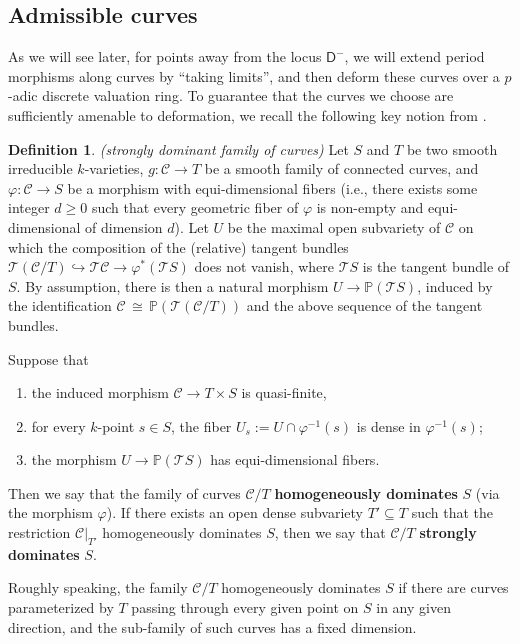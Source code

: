 \documentclass[11pt, letterpaper]{amsart}
\theoremstyle{plain}
\theoremstyle{definition}
\newtheorem{definition}[theorem]{Definition}
\newcommand{\IP}{\mathbb{P}}
\newcommand\iso{\,{\cong}\,}
\newcommand{\<}{\langle}
\renewcommand{\>}{\rangle}
\newcommand{\into}{\hookrightarrow}
\newcommand{\sfD}{\mathsf{D}}
\newcommand{\sT}{\mathcal{T}}
\newcommand{\shC}{\mathscr{C}}
\begin{document}
\subsection{Admissible curves}
\label{sub:adm_cur}
As we will see later, for points away from the locus $\sfD^-$, we will extend period morphisms along curves by ``taking limits'', and then deform these curves over a $p$-adic discrete valuation ring. To guarantee that the curves we choose are sufficiently amenable to deformation, we recall the following key notion from \cite[Def.~6.1.1]{HYZ}.

\begin{definition}
    \label{def: strongly dominant}
    \emph{(strongly dominant family of curves)}
    Let $S$ and $T$ be two smooth irreducible $k$-varieties, $g \colon \shC \to T$ be a smooth family of connected curves, and $\varphi\colon \shC \to S$ be a morphism with equi-dimensional fibers (i.e., there exists some integer $d \ge 0$ such that every geometric fiber of $\varphi$ is non-empty and equi-dimensional of dimension $d$). 
    Let $U$ be the maximal open subvariety of $\shC$ on which the composition of the (relative) tangent bundles $\sT(\shC/T) \into \sT \shC \to \varphi^*(\sT S)$ does not vanish, where $\sT S$ is the tangent bundle of $S$. 
    By assumption, there is then a natural morphism $U \to \IP(\sT S)$, induced by the identification $\shC \iso \IP(\sT(\shC/T))$ and the above sequence of the tangent bundles. 
    
Suppose that 
\begin{enumerate}[label=\upshape{(\roman*)}]
    \item the induced morphism $\shC \to T \times S$ is quasi-finite, 
    \item for every $k$-point $s \in S$, the fiber $U_s := U \cap \varphi^{-1}(s)$ is dense in $\varphi^{-1}(s)$; 
    \item the morphism $U \to \IP(\sT S)$ has equi-dimensional fibers. 
\end{enumerate}
Then we say that the family of curves $\shC/T$ \textbf{homogeneously dominates} $S$ (via the morphism $\varphi$). 
If there exists an open dense subvariety $T' \subseteq T$ such that the restriction $\shC|_{T'}$ homogeneously dominates $S$, then we say that $\shC/T$ \textbf{strongly dominates} $S$. 
\end{definition}

Roughly speaking, the family $\shC / T$ homogeneously dominates $S$ if there are curves parameterized by $T$ passing through every given point on $S$ in any given direction, and the sub-family of such curves has a fixed dimension. 
\end{document}
